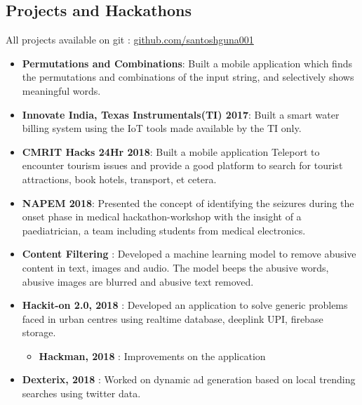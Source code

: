 \documentclass[margin, centered]{res}
\begin{document}
\begin{resume}
\section{Projects and Hackathons}
All projects available on git : \href{https://github.com/santoshguna001}{ github.com/santoshguna001 }
\begin{itemize}[leftmargin=*]
\item  \textbf{Permutations and Combinations}: Built a mobile application which finds the permutations and
combinations of the input string, and selectively shows meaningful
words.
\item  \textbf{Innovate India, Texas Instrumentals(TI) 2017}: Built a smart water billing system using
the IoT tools made available by the TI only. 
\item  \textbf{CMRIT Hacks 24Hr 2018}: Built a mobile application Teleport to encounter tourism issues and provide
a good platform to search for tourist attractions, book hotels, transport, et cetera. 
\item  \textbf{NAPEM 2018}: Presented the concept of identifying the seizures during the onset phase in medical hackathon-workshop with the
insight of a paediatrician, a  team including students from medical electronics.
\item \textbf{Content Filtering} : Developed a machine learning model to remove abusive content in text, images and audio. The model beeps the abusive words, abusive images are blurred and abusive text removed.
\item \textbf{Hackit-on 2.0, 2018} : Developed an application to solve generic problems faced in urban centres using realtime database, deeplink UPI, firebase storage.
\begin{itemize}
 \item \textbf{Hackman, 2018} : Improvements on the application
\end{itemize}
\item \textbf{Dexterix, 2018} : Worked on dynamic ad generation based on local trending searches using twitter data.
\end{itemize}





\end{resume}
\end{document}

